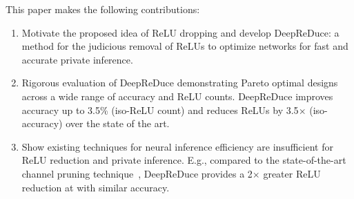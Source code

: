 This paper makes the following contributions:
\begin{enumerate}
    \item Motivate the proposed idea of ReLU dropping and develop DeepReDuce:
            a method for the judicious removal of ReLUs to optimize networks
            for fast and accurate private inference.

    \item Rigorous evaluation of DeepReDuce demonstrating Pareto optimal designs across a wide range of       accuracy and ReLU counts. 
        DeepReDuce improves accuracy up to     
        3.5\% (iso-ReLU count) and reduces ReLUs by 3.5$\times$ (iso-accuracy) over the state of the art.


    \item Show existing techniques for neural inference efficiency are insufficient for ReLU reduction and private inference. E.g., compared to the state-of-the-art channel pruning technique~\cite{he2020learning}, DeepReDuce provides a 2$\times$ greater ReLU reduction at with similar accuracy.
    \end{enumerate}

